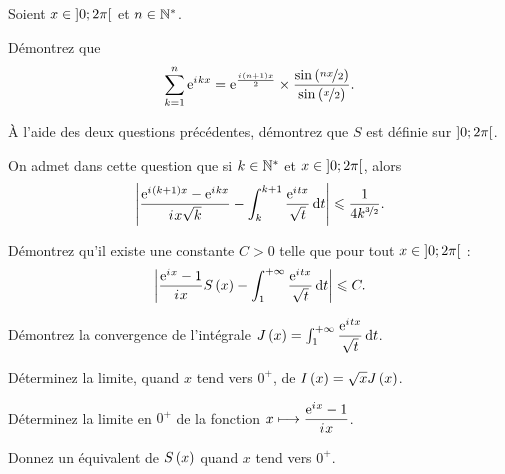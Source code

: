 \begin{q}
Soient \(x\in\left]0;2\pi\right[\) et \(n\in\mathbb{N}^*\).

Démontrez que \[\sum_{k=1}^n\mathrm{e}^{i\mkern1mu kx}=\mathrm{e}^{\frac{i\mkern1mu\left(n+1\right)x}{2}}\times\dfrac{\sin\left(\nicefrac{nx}{2}\right)}{\sin\left(\nicefrac{x}{2}\right)}.\]
\end{q}

\begin{q}
À l'aide des deux questions précédentes, démontrez que \(S\) est définie sur \(\left]0;2\pi\right[\).
\end{q}

\begin{q}
On admet dans cette question que si \(k\in\mathbb{N}^*\) et \(x\in\left]0;2\pi\right[\), alors \[\abs{\dfrac{\e{\i\paren{k+1}x}-\e{\i kx}}{\i x\sqrt{k}}-\int_k^{k+1}\dfrac{\e{\i tx}}{\sqrt{t}}\odif{t}}\leq\dfrac{1}{4k^{\nicefrac{3}{2}}}.\]

Démontrez qu'il existe une constante \(C>0\) telle que pour tout \(x\in\left]0;2\pi\right[\) : \[\abs{\dfrac{\e{\i x}-1}{\i x}S\paren{x}-\int_1^{\pinf}\dfrac{\e{\i tx}}{\sqrt{t}}\odif{t}}\leq C.\]
\end{q}

\begin{q}
Démontrez la convergence de l'intégrale \(J\paren{x}=\int_1^{\pinf}\dfrac{\e{\i tx}}{\sqrt{t}}\odif{t}\).

Déterminez la limite, quand \(x\) tend vers \(0^+\), de \(I\left(x\right)=\sqrt{x}J\left(x\right)\).
\end{q}

\begin{q}
Déterminez la limite en \(0^+\) de la fonction \(x\longmapsto\dfrac{\mathrm{e}^{i\mkern1mu x}-1}{i\mkern1mu x}\).

Donnez un équivalent de \(S\left(x\right)\) quand \(x\) tend vers \(0^+\).
\end{q}
